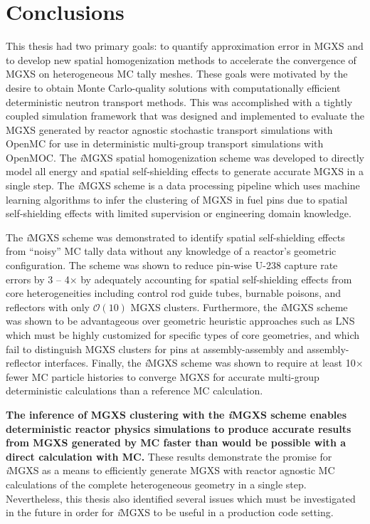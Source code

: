 \documentclass[12pt,twoside]{mitthesis-exec}
\begin{document}
\clearpage

\section*{Conclusions}

This thesis had two primary goals: to quantify approximation error in MGXS and to develop new spatial homogenization methods to accelerate the convergence of MGXS on heterogeneous MC tally meshes.  These goals were motivated by the desire to obtain Monte Carlo-quality solutions with computationally efficient deterministic neutron transport methods. This was accomplished with a tightly coupled simulation framework that was designed and implemented to evaluate the MGXS generated by reactor agnostic stochastic transport simulations with OpenMC for use in deterministic multi-group transport simulations with OpenMOC. The \textit{i}MGXS spatial homogenization scheme was developed to directly model all energy and spatial self-shielding effects to generate accurate MGXS in a single step. The \textit{i}MGXS scheme is a data processing pipeline which uses machine learning algorithms to infer the clustering of MGXS in fuel pins due to spatial self-shielding effects with limited supervision or engineering domain knowledge.

The \textit{i}MGXS scheme was demonstrated to identify spatial self-shielding effects from ``noisy'' MC tally data without any knowledge of a reactor's geometric configuration. The scheme was shown to reduce pin-wise U-238 capture rate errors by 3 -- 4$\times$ by adequately accounting for spatial self-shielding effects from core heterogeneities including control rod guide tubes, burnable poisons, and reflectors with only $\mathcal{O}(10)$ MGXS clusters. Furthermore, the \textit{i}MGXS scheme was shown to be advantageous over geometric heuristic approaches such as LNS which must be highly customized for specific types of core geometries, and which fail to distinguish MGXS clusters for pins at assembly-assembly and assembly-reflector interfaces. Finally, the \textit{i}MGXS scheme was shown to require at least 10$\times$ fewer MC particle histories to converge MGXS for accurate multi-group deterministic calculations than a reference MC calculation. 

\textbf{The inference of MGXS clustering with the \textit{i}MGXS scheme enables deterministic reactor physics simulations to produce accurate results from MGXS generated by MC faster than would be possible with a direct calculation with MC.} These results demonstrate the promise for \textit{i}MGXS as a means to efficiently generate MGXS with reactor agnostic MC calculations of the complete heterogeneous geometry in a single step. Nevertheless, this thesis also identified several issues which must be investigated in the future in order for \textit{i}MGXS to be useful in a production code setting.
\end{document}
